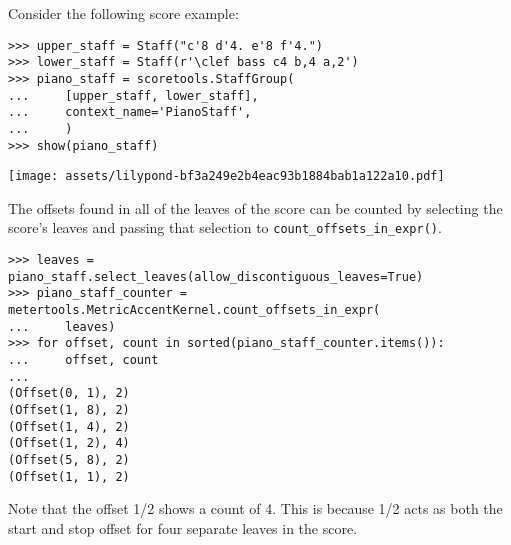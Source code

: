 Consider the following score example:

\begin{comment}
<abjad>
upper_staff = Staff("c'8 d'4. e'8 f'4.")
lower_staff = Staff(r'\clef bass c4 b,4 a,2')
piano_staff = scoretools.StaffGroup(
    [upper_staff, lower_staff],
    context_name='PianoStaff',
    )
show(piano_staff)
</abjad>
\end{comment}

\begin{singlespacing}
\vspace{-0.5\baselineskip}
\begin{lstlisting}
>>> upper_staff = Staff("c'8 d'4. e'8 f'4.")
>>> lower_staff = Staff(r'\clef bass c4 b,4 a,2')
>>> piano_staff = scoretools.StaffGroup(
...     [upper_staff, lower_staff],
...     context_name='PianoStaff',
...     )
>>> show(piano_staff)
\end{lstlisting}
\texttt{[image: assets/lilypond-bf3a249e2b4eac93b1884bab1a122a10.pdf]}
\end{singlespacing}

\noindent The offsets found in all of the leaves of the score can be counted by
selecting the score's leaves and passing that selection to
\texttt{count\_offsets\_in\_expr()}.

\begin{comment}
<abjad>
leaves = piano_staff.select_leaves(allow_discontiguous_leaves=True)
piano_staff_counter = metertools.MetricAccentKernel.count_offsets_in_expr(
    leaves)
for offset, count in sorted(piano_staff_counter.items()):
    offset, count

</abjad>
\end{comment}

\begin{singlespacing}
\vspace{-0.5\baselineskip}
\begin{lstlisting}
>>> leaves = piano_staff.select_leaves(allow_discontiguous_leaves=True)
>>> piano_staff_counter = metertools.MetricAccentKernel.count_offsets_in_expr(
...     leaves)
>>> for offset, count in sorted(piano_staff_counter.items()):
...     offset, count
...
(Offset(0, 1), 2)
(Offset(1, 8), 2)
(Offset(1, 4), 2)
(Offset(1, 2), 4)
(Offset(5, 8), 2)
(Offset(1, 1), 2)
\end{lstlisting}
\end{singlespacing}

\noindent Note that the offset 1/2 shows a count of 4. This is because 1/2 acts
as both the start and stop offset for four separate leaves in the score.

